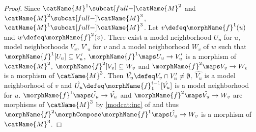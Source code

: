 \documentclass{article}
\begin{document}
\begin{lemma}
\begin{proof}
Since $\catName{M}^1 \subcat[full-] \catName{M}^2$ and
$\catName{M}^2 \subcat[full-] \catName{M}^3$,
$\catName{M}^1 \subcat[full-] \catName{M}^3$.
Let  $v \defeq \morphName{f}^1(u)$ and
$w \defeq \morphName{f}^2(v)$. There exist a model neighborhood $U_u$
for $u$, model neighborhoods $V_v$, $V'_u$ for $v$ and a model
neighborhood $W_v$ of $w$ such that
$\morphName{f}^1[U_u] \subseteq V'_u$,
$\morphName{f}^1 \maps U_u \to V'_u$ is a morphism of $\catName{M}^2$,
$\morphName{f}^2[V_v] \subseteq W_v$ and
$\morphName{f}^2 \maps V_v \to W_v$ is a morphism of $\catName{M}^3$.
Then $\hat{V_u} \defeq V_v \cap V'_u \neq \emptyset$, $\hat{V_u}$ is a
model neighborhood of $v$ and
$\hat{U_u} \defeq \morphName{f}^{i-1}_1[\hat{V_u}]$ is a model
neighborhood for $u$.  $\morphName{f}^1 \maps \hat{U_u} \to \hat{V_u}$
and $\morphName{f}^2 \maps \hat{V_u} \to W_v$ are morphisms of
$\catName{M}^3$ by
{
  \showlabelsinline
  \cref{modcat:inc}
}
of  and thus
$\morphName{f}^2 \morphCompose \morphName{f}^1 \maps \hat{U_u} \to W_v$ is a
morphism of $\catName{M}^3$.
\end{proof}
\end{lemma}
\end{document}
